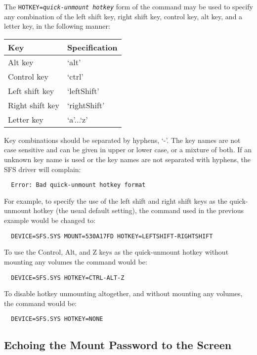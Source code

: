 The {\tt HOTKEY={\em quick-unmount hotkey}} form of the command may be used to specify
any combination of the left shift key, right shift key, control key, alt key,
and a letter key, in the following manner:

\begin{center}
\begin{tabular}{|l|l|}
\hline
    Key            & Specification\\
\hline
    Alt key        & `alt'\\
    Control key    & `ctrl'\\
    Left shift key & `leftShift'\\
    Right shift key& `rightShift'\\
    Letter key     & `a'...`z'\\
\hline
\end{tabular}
\end{center}

Key combinations should be separated by hyphens, `-'.  The key names are not
case sensitive and can be given in upper or lower case, or a mixture of both.
If an unknown key name is used or the key names are not separated with hyphens,
the SFS driver will complain:

{\tt \verb|  |Error: Bad quick-unmount hotkey format}

For example, to specify the use of the left shift and right shift keys as the
quick-unmount hotkey (the usual default setting), the command used in the
previous example would be changed to:

{\tt \verb|  |DEVICE=SFS.SYS MOUNT=530A17FD HOTKEY=LEFTSHIFT-RIGHTSHIFT}

To use the Control, Alt, and Z keys as the quick-unmount hotkey without
mounting any volumes the command would be:

{\tt \verb|  |DEVICE=SFS.SYS HOTKEY=CTRL-ALT-Z}

To disable hotkey unmounting altogether, and without mounting any volumes, the 
command would be:

{\tt \verb|  |DEVICE=SFS.SYS HOTKEY=NONE}


\subsection{Echoing the Mount Password to the Screen}

